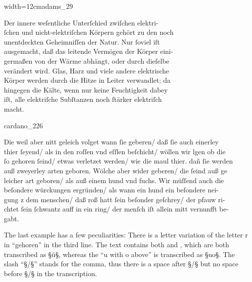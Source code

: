 \begin{sampleImageSmall}[ 2]{width=12cm}{adams_29}
\begin{typeLatin}
Der innere weſentliche Unterſchied zwiſchen elektri- \\
ſchen und nicht-elektriſchen Körpern gehört zu den noch \\
unentdeckten Geheimniſſen der Natur. Nur ſoviel iſt \\
ausgemacht, daß das leitende Vermögen der Körper eini- \\
germaßen von der Wärme abhängt, oder durch dieſelbe \\
verändert wird. Glas, Harz und viele andere elektrische \\
Körper werden durch die Hitze in Leiter verwandlet; da \\
hingegen die Kälte, wenn nur keine Feuchtigkeit dabey \\
iſt, alle elektriſche Subſtanzen noch ſtärker elektriſch \\
macht. \\
\end{typeLatin}
\end{sampleImageSmall}

\begin{sampleImage}[ 3]{cardano_226}
\begin{typeLatin}
Die weil aber nitt geleich volget wann ſie geberen/ daß ſie auch einerley \\
thier ſeyend/ als in den roſſen vnd eſſlen beſchicht/ wöllen wir lgen ob die \\
ſo gehoren ſeind/ etwas verletzet werden/ wie die maul thier. dañ ſie werden \\
auß zweyerley arten geboren. Wölche aber wider geberen/ die ſeind auß ge \\
leicher art geboren/ als auß einem hund vnd fuchs. Wir müſſend auch die \\
beſondere würckungen ergründen/ als wann ein hund ein beſondere nei- \\
gung z dem menschen/ daß roß hatt ſein beſonder geſchrey/ der pfauw ri- \\
chtet ſein ſchwantz auff in ein ring/ der menſch iſt allein mitt vernunfft be- \\
gabt.
\end{typeLatin}
\end{sampleImage}

\begin{note}
The last example has a few peculiarities: There is a letter variation of the letter r in “gehoren” in the third line. The text contains both  and , which are both transcribed as §ü§, whereas the “u with o above” is transcribed as §{uo}§. The slash “§/§” stands for the comma, thus there is a space after §/§ but no space before §/§ in the transcription.
\end{note}


